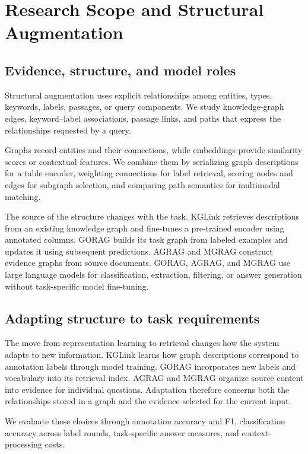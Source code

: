 \section{Research Scope and Structural Augmentation}
\label{sec:introduction:scope}
\subsection{Evidence, structure, and model roles}
Structural augmentation uses explicit relationships among entities, types, keywords, labels, passages, or query components. We study knowledge-graph edges, keyword--label associations, passage links, and paths that express the relationships requested by a query.

Graphs record entities and their connections, while embeddings provide similarity scores or contextual features. We combine them by serializing graph descriptions for a table encoder, weighting connections for label retrieval, scoring nodes and edges for subgraph selection, and comparing path semantics for multimodal matching.

The source of the structure changes with the task. KGLink retrieves descriptions from an existing knowledge graph and fine-tunes a pre-trained encoder using annotated columns. GORAG builds its task graph from labeled examples and updates it using subsequent predictions. AGRAG and MGRAG construct evidence graphs from source documents. GORAG, AGRAG, and MGRAG use large language models for classification, extraction, filtering, or answer generation without task-specific model fine-tuning.

\subsection{Adapting structure to task requirements}

The move from representation learning to retrieval changes how the system adapts to new information. KGLink learns how graph descriptions correspond to annotation labels through model training. GORAG incorporates new labels and vocabulary into its retrieval index. AGRAG and MGRAG organize source content into evidence for individual questions. Adaptation therefore concerns both the relationships stored in a graph and the evidence selected for the current input.

We evaluate these choices through annotation accuracy and F1, classification accuracy across label rounds, task-specific answer measures, and context-processing costs.

